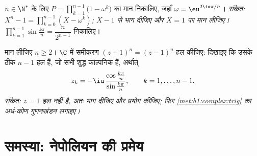 \begin{exercise}[$\star\star\star$]\label{exo:b1:complex:11}
$n \in \N^*$ के लिए $P = \prod_{k=1}^{n-1} \bigl(1 - \omega^k\bigr)$ का मान
निकालिए, जहाँ $\omega = \eu^{2\iu\pi/n}$। \emph{संकेत: $X^n - 1 =
\prod_{k=0}^{n-1} (X - \omega^k)$; $X - 1$ से भाग दीजिए और $X = 1$ पर मान
लीजिए।} $\prod_{k=1}^{n-1} \sin\frac{k\pi}{n} = \dfrac{n}{2^{n-1}}$ निकालिए।
\end{exercise}

\begin{exercise}[$\star\star$]\label{exo:b1:complex:12}
मान लीजिए $n \geq 2$। $\C$ में समीकरण $(z + 1)^n = (z - 1)^n$ हल कीजिए:
दिखाइए कि उसके ठीक $n - 1$ हल हैं, जो सभी शुद्ध काल्पनिक हैं, अर्थात्
\[
z_k = -\iu\,\frac{\cos\frac{k\pi}{n}}{\sin\frac{k\pi}{n}},
\qquad k = 1, \dots, n - 1 .
\]
\emph{संकेत: $z = 1$ हल नहीं है, अतः भाग दीजिए और  प्रयोग कीजिए;
फिर \cref{met:b1:complex:trig} का अर्ध-कोण गुणनखंडन लगाइए।}
\end{exercise}

\section{समस्या: नेपोलियन की प्रमेय}


